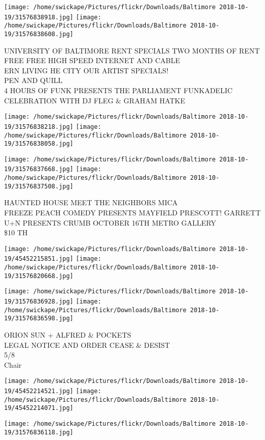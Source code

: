 \documentclass[10pt,letterpaper]{article}
\begin{document}
\texttt{[image: /home/swickape/Pictures/flickr/Downloads/Baltimore 2018-10-19/31576838918.jpg]}
\texttt{[image: /home/swickape/Pictures/flickr/Downloads/Baltimore 2018-10-19/31576838608.jpg]}

UNIVERSITY OF BALTIMORE RENT SPECIALS TWO MONTHS OF RENT FREE FREE HIGH SPEED INTERNET AND CABLE\\
ERN LIVING HE CITY OUR ARTIST SPECIALS!\\
PEN AND QUILL\\
4 HOURS OF FUNK PRESENTS THE PARLIAMENT FUNKADELIC CELEBRATION WITH DJ FLEG \& GRAHAM HATKE
\pagebreak

\texttt{[image: /home/swickape/Pictures/flickr/Downloads/Baltimore 2018-10-19/31576838218.jpg]}
\texttt{[image: /home/swickape/Pictures/flickr/Downloads/Baltimore 2018-10-19/31576838058.jpg]}

\texttt{[image: /home/swickape/Pictures/flickr/Downloads/Baltimore 2018-10-19/31576837668.jpg]}
\texttt{[image: /home/swickape/Pictures/flickr/Downloads/Baltimore 2018-10-19/31576837508.jpg]}

HAUNTED HOUSE MEET THE NEIGHBORS MICA\\
FREEZE PEACH COMEDY PRESENTS MAYFIELD PRESCOTT!  GARRETT\\
U+N PRESENTS CRUMB OCTOBER 16TH METRO GALLERY\\
\$10 TH
\pagebreak

\texttt{[image: /home/swickape/Pictures/flickr/Downloads/Baltimore 2018-10-19/45452215851.jpg]}
\texttt{[image: /home/swickape/Pictures/flickr/Downloads/Baltimore 2018-10-19/31576820668.jpg]}

\texttt{[image: /home/swickape/Pictures/flickr/Downloads/Baltimore 2018-10-19/31576836928.jpg]}
\texttt{[image: /home/swickape/Pictures/flickr/Downloads/Baltimore 2018-10-19/31576836598.jpg]}

ORION SUN + ALFRED \& POCKETS\\
LEGAL NOTICE AND ORDER CEASE \& DESIST\\
5/8\\
Chair
\pagebreak

\texttt{[image: /home/swickape/Pictures/flickr/Downloads/Baltimore 2018-10-19/45452214521.jpg]}
\texttt{[image: /home/swickape/Pictures/flickr/Downloads/Baltimore 2018-10-19/45452214071.jpg]}

\vspace{0.25in}
\texttt{[image: /home/swickape/Pictures/flickr/Downloads/Baltimore 2018-10-19/31576836118.jpg]}
\end{document}
